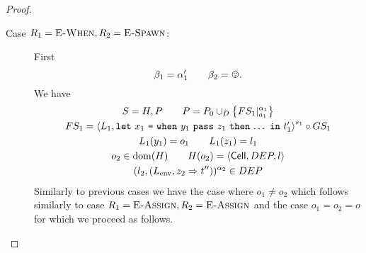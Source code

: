 \begin{proof}
\begin{description}
    \item[Case $R_1 = \mbox{{\sc E-When}}, R_2 = \mbox{\sc E-Spawn}$:] First 
      \begin{equation}
        \beta_1 = \alpha'_1 \andalso \beta_2 = \smiley.
      \end{equation}
      We have
      \begin{equation}
        \begin{gathered}
          S = H, P \quad\quad P = P_0 \cup_D \left\{ FS_1|_{a_1}^{\alpha_1}
          \right\} \\
          FS_1 = \mbox{$\langle L_1, \mbox{\mdseries\texttt{let}~$x_1$~\texttt{=}~$\mbox{\mdseries\texttt{when}~$y_1$~\texttt{pass}~$z_1$~\texttt{then}~$\dots$}$~\texttt{in}~$t'_1$} \rangle$}^{s_1} \circ GS_1
          \\ 
          L_1(y_1) = o_1 \quad\quad L_1(z_1) = l_1 \\
          o_2 \in \mbox{$\mathrm{dom}$}(H) \quad\quad H(o_2) = \mbox{$\langle \mbox{$\mathsf{Cell}$}{}, DEP, l \rangle$} \\
          (l_2, (L_{\text{env}}, z_2 \Rightarrow t''))^{\alpha_2} \in DEP
        \end{gathered}
      \end{equation}
      Similarly to previous cases we have the case where $o_1 \neq o_2$ which
      follows similarly to case $R_1 = \mbox{{\sc E-Assign}}, R_2 = \mbox{{\sc E-Assign}}$ and the case
      $o_1 = o_2 = o$ for which we proceed as follows.


\end{description}
\end{proof}
